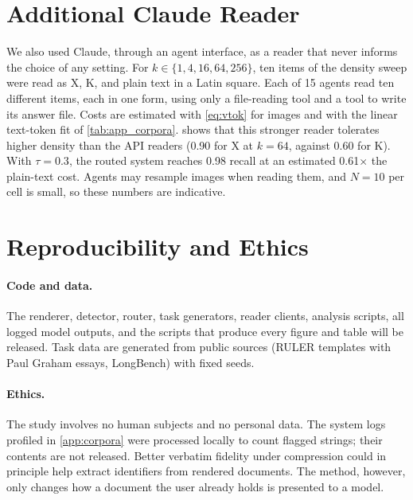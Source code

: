 

\section{Additional Claude Reader}
\label{app:claude}

We also used Claude, through an agent interface, as a reader that never informs the choice of any setting.
For $k\in\{1,4,16,64,256\}$, ten items of the density sweep were read as X, K, and plain text in a Latin square.
Each of 15 agents read ten different items, each in one form, using only a file-reading tool and a tool to write its answer file.
Costs are estimated with \cref{eq:vtok} for images and with the linear text-token fit of \cref{tab:app_corpora}.
 shows that this stronger reader tolerates higher density than the API readers (0.90 for X at $k{=}64$, against 0.60 for K).
With $\tau{=}0.3$, the routed system reaches 0.98 recall at an estimated 0.61$\times$ the plain-text cost.
Agents may resample images when reading them, and $N{=}10$ per cell is small, so these numbers are indicative.



\section{Reproducibility and Ethics}
\label{app:repro}

\paragraph{Code and data.}
The renderer, detector, router, task generators, reader clients, analysis scripts, all logged model outputs, and the scripts that produce every figure and table will be released.
Task data are generated from public sources (RULER templates with Paul Graham essays, LongBench) with fixed seeds.

\paragraph{Ethics.}
The study involves no human subjects and no personal data.
The system logs profiled in \cref{app:corpora} were processed locally to count flagged strings; their contents are not released.
Better verbatim fidelity under compression could in principle help extract identifiers from rendered documents.
The method, however, only changes how a document the user already holds is presented to a model.
